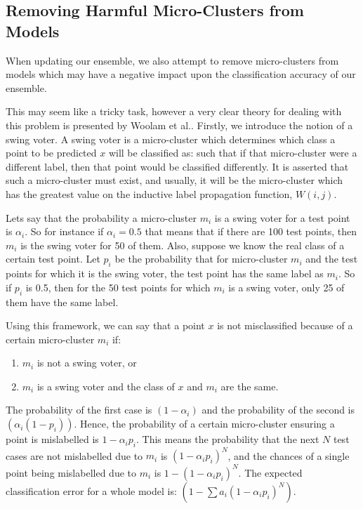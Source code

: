 \documentclass[12pt,a4paper,oneside]{report}
\begin{document}
\subsection*{Removing Harmful Micro-Clusters from Models}

When updating our ensemble, we also attempt to remove micro-clusters from models which may have a negative impact upon the classification accuracy of our ensemble. 

This may seem like a tricky task, however a very clear theory for dealing with this problem is presented by Woolam et al.\cite{LabStr}. Firstly, we introduce the notion of a swing voter. A swing voter is a micro-cluster which determines which class a point to be predicted $x$ will be classified as: such that if that micro-cluster were a different label, then that point would be classified differently. It is asserted that such a micro-cluster must exist, and usually, it will be the micro-cluster which has the greatest value on the inductive label propagation function, $W(i,j)$.

Lets say that the probability a micro-cluster $m_i$ is a swing voter for a test point is $\alpha_i$. So for instance if $\alpha_i = 0.5$ that means that if there are 100 test points, then $m_i$ is the swing voter for 50 of them. Also, suppose we know the real class of a certain test point. Let $p_i$ be the probability that for micro-cluster $m_i$ and the test points for which it is the swing voter, the test point has the same label as $m_i$. So if $p_i$ is 0.5, then for the 50 test points for which $m_i$ is a swing voter, only 25 of them have the same label. 

Using this framework, we can say that a point $x$ is not misclassified because of a certain micro-cluster $m_i$ if:
\begin{enumerate}
\item $m_i$ is not a swing voter, or
\item $m_i$ is a swing voter and the class of $x$ and $m_i$ are the same.
\end{enumerate}

The probability of the first case is $(1-\alpha_i)$ and the probability of the second is $(\alpha_i(1-p_i))$. Hence, the probability of a certain micro-cluster ensuring a point is mislabelled is $1-\alpha_ip_i$. This means the probability that the next $N$ test cases are not mislabelled due to $m_i$ is $(1-\alpha_ip_i)^N$, and the chances of a single point being mislabelled due to $m_i$ is $1-(1-\alpha_ip_i)^N$. The expected classification error for a whole model is: $(1-\sum a_i(1-\alpha_ip_i)^N)$.
\end{document}
